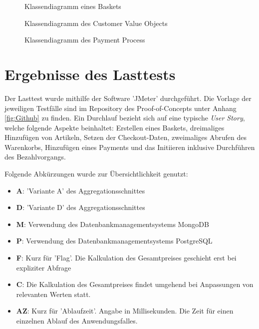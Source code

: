 \begin{anhang}
\vspace{1cm}
\begin{figure}[htbp]
	\centering
	
	\caption{Klassendiagramm eines Baskets}
	\label{fig:VO-Basket}
\end{figure}

\begin{figure}[htbp]
	\centering
	
	\caption{Klassendiagramm des Customer Value Objects}
	\label{fig:VO-Customer}
\end{figure}

\begin{figure}[htbp]
	\centering
	
	\caption{Klassendiagramm des Payment Process}
	\label{fig:VO-Payment}
\end{figure}

\section{Ergebnisse des Lasttests} \label{label:Lasttests}

Der Lasttest wurde mithilfe der Software 'JMeter' durchgeführt. Die Vorlage der jeweiligen Testfälle sind im Repository des Proof-of-Concepts unter Anhang \ref{fig:Github} zu finden. Ein Durchlauf bezieht sich auf eine typische \emph{\Gls{User Story}}, welche folgende Aspekte beinhaltet: Erstellen eines Baskets, dreimaliges Hinzufügen von Artikeln, Setzen der Checkout-Daten, zweimaliges Abrufen des Warenkorbs, Hinzufügen eines Payments und das Initiieren inklusive Durchführen des Bezahlvorgangs. 

Folgende Abkürzungen wurde zur Übersichtlichkeit genutzt:
\begin{itemize}[noitemsep,nolistsep]
	\item \textbf{A}: 'Variante A' des Aggregationsschnittes
	\item \textbf{D}: 'Variante D' des Aggregationsschnittes
	\item \textbf{M}: Verwendung des Datenbankmanagementsystems MongoDB
	\item \textbf{P}: Verwendung des Datenbankmanagementsystems PostgreSQL
	\item \textbf{F}: Kurz für 'Flag'. Die Kalkulation des Gesamtpreises geschieht erst bei expliziter Abfrage
	\item \textbf{C}: Die Kalkulation des Gesamtpreises findet umgehend bei Anpassungen von relevanten Werten statt.
	\item \textbf{AZ}: Kurz für 'Ablaufzeit'. Angabe in Millisekunden. Die Zeit für einen einzelnen Ablauf des Anwendungsfalles. 
\end{itemize}



\end{anhang}

